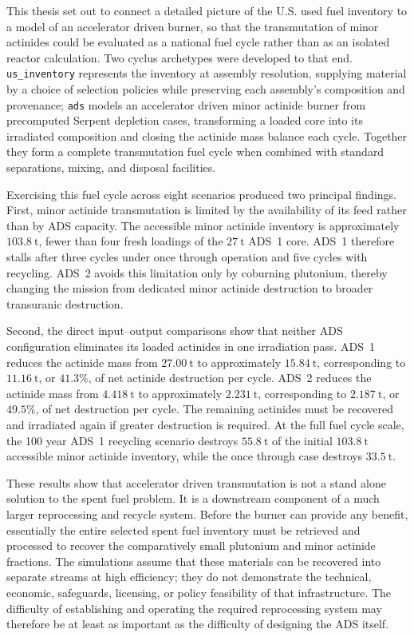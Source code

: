 This thesis set out to connect a detailed picture of the U.S. used fuel inventory
to a model of an accelerator driven burner, so that the transmutation of minor
actinides could be evaluated as a national fuel cycle rather than as an isolated
reactor calculation. Two cyclus archetypes were developed to that end.
\texttt{us\_inventory} represents the inventory at assembly resolution, supplying
material by a choice of selection policies while preserving each assembly's
composition and provenance; \texttt{ads} models an accelerator driven
minor actinide burner from precomputed Serpent depletion cases, transforming a
loaded core into its irradiated composition and closing the actinide mass balance
each cycle. Together they form a complete transmutation fuel cycle when combined
with standard separations, mixing, and disposal facilities.

Exercising this fuel cycle across eight scenarios produced two principal
findings. First, minor actinide transmutation is limited by the availability
of its feed rather than by ADS capacity. The accessible minor actinide
inventory is approximately \(103.8~\mathrm{t}\), fewer than four fresh
loadings of the \(27~\mathrm{t}\) ADS~1 core. ADS~1 therefore stalls after
three cycles under once through operation and five cycles with recycling.
ADS~2 avoids this limitation only by coburning plutonium, thereby changing
the mission from dedicated minor actinide destruction to broader transuranic
destruction.

Second, the direct input--output comparisons show that neither ADS
configuration eliminates its loaded actinides in one irradiation pass.
ADS~1 reduces the actinide mass from \(27.00~\mathrm{t}\) to approximately
\(15.84~\mathrm{t}\), corresponding to \(11.16~\mathrm{t}\), or
\(41.3\%\), of net actinide destruction per cycle. ADS~2 reduces the
actinide mass from \(4.418~\mathrm{t}\) to approximately
\(2.231~\mathrm{t}\), corresponding to \(2.187~\mathrm{t}\), or
\(49.5\%\), of net destruction per cycle. The remaining actinides must be
recovered and irradiated again if greater destruction is required. At the
full fuel cycle scale, the 100 year ADS~1 recycling scenario destroys
\(55.8~\mathrm{t}\) of the initial \(103.8~\mathrm{t}\) accessible
minor actinide inventory, while the once through case destroys
\(33.5~\mathrm{t}\).

These results show that accelerator driven transmutation is not a stand alone
solution to the spent fuel problem. It is a downstream component of a much
larger reprocessing and recycle system. Before the burner can provide any
benefit, essentially the entire selected spent fuel inventory must be
retrieved and processed to recover the comparatively small plutonium and
minor actinide fractions. The simulations assume that these materials can be
recovered into separate streams at high efficiency; they do not demonstrate
the technical, economic, safeguards, licensing, or policy feasibility of that
infrastructure. The difficulty of establishing and operating the required
reprocessing system may therefore be at least as important as the difficulty
of designing the ADS itself.

